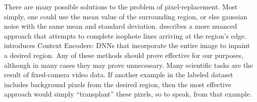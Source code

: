 \documentclass[10pt, journal]{IEEEtran}
\begin{document}
There are many possible solutions to the problem of pixel-replacement. Most
simply, one could use the mean value of the surrounding region, or else gaussian
noise with the same mean and standard deviation. \cite{bertalmio_image_2000}
describes a more nuanced approach that attempts to complete isophote lines
arriving at the region's edge. \cite{pathak_context_2016} introduces Context
Encoders: DNNs that incorporate the entire image to inpaint a desired
region. Any of these methods should prove effective for our purposes, although
in many cases they may prove unnecessary. Many scientific tasks are the result
of fixed-camera video data. If another example in the labeled dataset includes
background pixels from the desired region, then the most effective approach
would simply ``transplant'' these pixels, so to speak, from that example.





\end{document}
